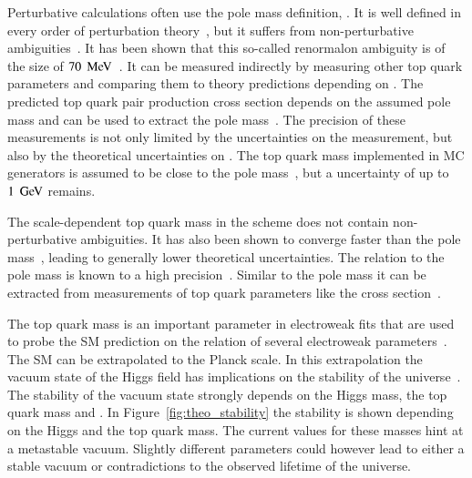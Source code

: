 Perturbative calculations often use the pole mass definition, \mtp. It is well defined in every order of perturbation theory~\cite{Bigi:1994em}, but it suffers from non-perturbative ambiguities~\cite{Dowling:2013baa,Beneke:1994sw}.
It has been shown that this so-called renormalon ambiguity is of the size of $70\; \,\text{Me\hspace{-.08em}V}$~\cite{Beneke:2016cbu}.
It can be measured indirectly by measuring other top quark parameters and comparing them to theory predictions depending on \mtp. The predicted top quark pair production cross section depends on the assumed pole mass and can be
used to extract the pole mass~\cite{Aad:2014kva,Khachatryan:2016mqs}. The precision of these measurements is not only limited by the uncertainties on the measurement, but also by the theoretical uncertainties on \mtp.
The top quark mass implemented in MC generators is assumed to be close to the pole mass~\cite{Buckley:2011ms}, but a uncertainty of up to $1\;\,\text{Ge\hspace{-.08em}V}$ remains.

The scale-dependent top quark mass in the \msbar scheme does not contain non-perturbative ambiguities. It has also been shown to converge faster than the pole mass~\cite{Dowling:2013baa}, leading to generally lower theoretical
uncertainties. The relation to the pole mass is known to a high precision~\cite{Marquard:2015qpa}. Similar to the pole mass it can be extracted from measurements of top quark parameters like the \ttbar cross section~\cite{Abazov:2011pta}. 

The top quark mass is an important parameter in electroweak fits that are used to probe the SM prediction on the relation of several electroweak parameters~\cite{Baak:2014ora}.
The SM can be extrapolated to the Planck scale. In this extrapolation the vacuum state of the Higgs field has implications on the stability of the universe~\cite{Buttazzo:2013uya}.
The stability of the vacuum state strongly depends on the Higgs mass, the top quark mass and \as. In Figure~\ref{fig:theo_stability} the stability is shown depending on the 
Higgs and the top quark mass. The current values for these masses hint at a metastable vacuum. Slightly different parameters could however lead to either a stable vacuum or contradictions
to the observed lifetime of the universe.

